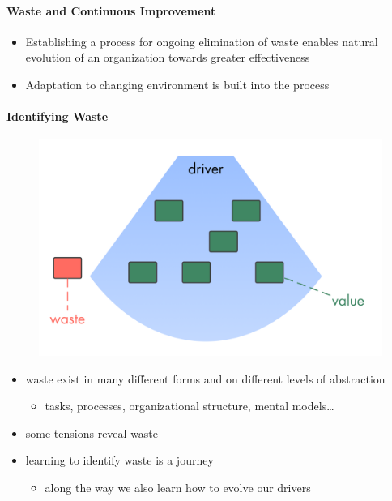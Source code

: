 \paragraph{Waste and Continuous Improvement}
\label{wasteandcontinuousimprovement}

\begin{itemize}
\item Establishing a process for ongoing elimination of waste enables natural evolution of an organization towards greater effectiveness

\item Adaptation to changing environment is built into the process

\end{itemize}

\paragraph{Identifying Waste}
\label{identifyingwaste}

\begin{figure}[htbp]
\centering
\includegraphics[keepaspectratio,width=\textwidth,height=0.75\textheight]{img/evolution/drivers-value-waste.png}
\end{figure}

\begin{itemize}
\item waste exist in many different forms and on different levels of abstraction

\begin{itemize}
\item tasks, processes, organizational structure, mental models{\ldots}

\end{itemize}

\item some tensions reveal waste

\item learning to identify waste is a journey

\begin{itemize}
\item along the way we also learn how to evolve our drivers

\end{itemize}

\end{itemize}

